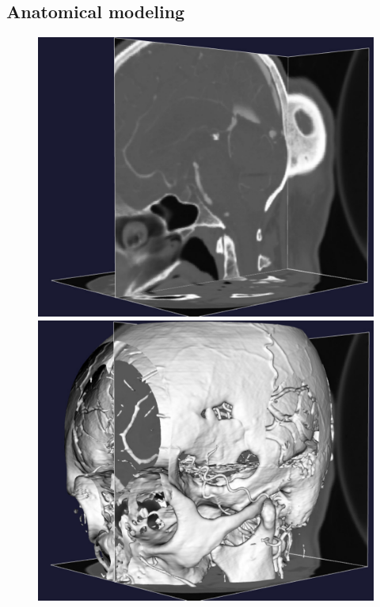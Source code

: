 \subsection{Anatomical modeling} \label{vmtk}

\begin{figure}
          {\includegraphics[width=\threefigsfull]{chapters/kvs-2/pdf/stacks.pdf}
            \includegraphics[width=\threefigsfull]{chapters/kvs-2/pdf/3d.pdf}
}
\end{figure}
